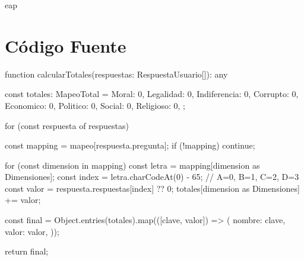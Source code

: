 eap\chapter{Código Fuente}

function calcularTotales(respuestas: RespuestaUsuario[]): any {
  const totales: MapeoTotal = {
    Moral: 0, Legalidad: 0, Indiferencia: 0, Corrupto: 0,
    Economico: 0, Politico: 0, Social: 0, Religioso: 0,
  };

  for (const respuesta of respuestas) {
    const mapping = mapeo[respuesta.pregunta];
    if (!mapping) continue;

    for (const dimension in mapping) {
      const letra = mapping[dimension as Dimensiones];
      const index = letra.charCodeAt(0) - 65; // A=0, B=1, C=2, D=3
      const valor = respuesta.respuestas[index] ?? 0;
      totales[dimension as Dimensiones] += valor;
    }
  }

  const final = Object.entries(totales).map(([clave, valor]) => ({
    nombre: clave,
    valor: valor,
  }));

  return final;
}